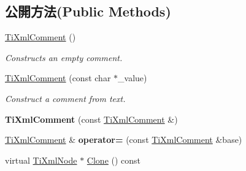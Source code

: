 \subsection*{公開方法(Public Methods)}
\begin{DoxyCompactItemize}
\item 
\hyperlink{class_ti_xml_comment_aaa3252031d3e8bd3a2bf51a1c61201b7}{Ti\+Xml\+Comment} ()\hypertarget{class_ti_xml_comment_aaa3252031d3e8bd3a2bf51a1c61201b7}{}\label{class_ti_xml_comment_aaa3252031d3e8bd3a2bf51a1c61201b7}

\begin{DoxyCompactList}\small\item\em Constructs an empty comment. \end{DoxyCompactList}\item 
\hyperlink{class_ti_xml_comment_a37e7802ef17bc03ebe5ae79bf0713d47}{Ti\+Xml\+Comment} (const char $\ast$\+\_\+value)\hypertarget{class_ti_xml_comment_a37e7802ef17bc03ebe5ae79bf0713d47}{}\label{class_ti_xml_comment_a37e7802ef17bc03ebe5ae79bf0713d47}

\begin{DoxyCompactList}\small\item\em Construct a comment from text. \end{DoxyCompactList}\item 
{\bfseries Ti\+Xml\+Comment} (const \hyperlink{class_ti_xml_comment}{Ti\+Xml\+Comment} \&)\hypertarget{class_ti_xml_comment_afaec41ac2760ce946ba1590eb5708e50}{}\label{class_ti_xml_comment_afaec41ac2760ce946ba1590eb5708e50}

\item 
\hyperlink{class_ti_xml_comment}{Ti\+Xml\+Comment} \& {\bfseries operator=} (const \hyperlink{class_ti_xml_comment}{Ti\+Xml\+Comment} \&base)\hypertarget{class_ti_xml_comment_aeceedc15f8b8f9ca0b6136696339b3ac}{}\label{class_ti_xml_comment_aeceedc15f8b8f9ca0b6136696339b3ac}

\item 
virtual \hyperlink{class_ti_xml_node}{Ti\+Xml\+Node} $\ast$ \hyperlink{class_ti_xml_comment_a4f6590c9c9a2b63a48972655b78eb853}{Clone} () const \hypertarget{class_ti_xml_comment_a4f6590c9c9a2b63a48972655b78eb853}{}\label{class_ti_xml_comment_a4f6590c9c9a2b63a48972655b78eb853}


\end{DoxyCompactItemize}
